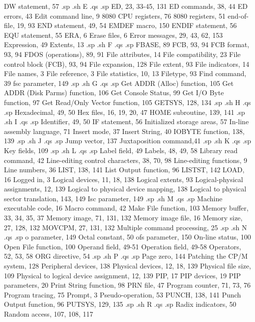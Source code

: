 DW statement, 57
.sp
.sh
E
.qs
.sp
ED, 23, 33-45, 131
ED commands, 38, 44
ED errors, 43
Edit command line, 9
8080 CPU registers, 76
8080 registers, 51
end-of-file, 19, 93
END statement, 49, 54
EMDEF macro, 150
ENDIF statement, 56
EQU statement, 55
ERA, 6
Erase files, 6
Error messages, 29, 43, 
    62, 153
Expression, 49
Extents, 13
.sp
.sh
F
.qs
.sp
FBASE, 89
FCB, 93, 94
FCB format, 93, 94
FDOS (operations), 89, 91
File attributes, 14
File compatibility, 23
File control block (FCB), 
    93, 94
File expansion, 128
File extent, 93
File indicators, 14
File names, 3
File reference, 3
File statistics, 10, 13
Filetype, 93
Find command, 39
fsc parameter, 149
.sp
.sh
G
.qs
.sp
Get ADDR (Alloc) function, 
    105
Get ADDR (Disk Parms) 
    function, 106
Get Console Status, 99
Get I/O Byte function, 97
Get Read/Only Vector 
    function, 105
GETSYS, 128, 134
.sp
.sh
H
.qs
.sp
Hexadecimal, 49, 50
Hex files, 16, 19, 20, 47
HOME subroutine, 139, 141
.sp
.sh
I
.qs
.sp
Identifier, 49, 50
IF statement, 56
Initialized storage areas, 57
In-line assembly language, 71
Insert mode, 37
Insert String, 40
IOBYTE function, 138, 139
.sp
.sh
J
.qs
.sp
Jump vector, 137
Juxtaposition command,41
.sp
.sh
K
.qs
.sp
Key fields, 109
.sp
.sh
L
.qs
.sp
Label field, 49
Labels, 48, 49, 58
Library read command, 42
Line-editing control 
    characters, 38, 70, 98
Line-editing functions, 9
Line numbers, 36
LIST, 138, 141
List Output function, 96
LISTST, 142
LOAD, 16
Logged in, 3
Logical devices, 11, 18, 138
Logical extents, 93
Logical-physical assignments, 
   12, 139
Logical to physical device 
    mapping, 138
Logical to physical sector 
    translation, 143, 149
Isc parameter, 149
.sp
.sh
M
.qs
.sp
Machine executable code, 16
Macro command, 42      
Make File function, 103
Memory buffer, 33, 34, 35, 37
Memory image, 71, 131, 132
Memory image file, 16
Memory size, 27, 128, 132
MOVCPM, 27, 131, 132
Multiple command 
    processing, 25
.sp
.sh
N
.qs
.sp
{o} parameter, 149
Octal constant, 50
ofs parameter, 150
On-line status, 100
Open File function, 100
Operand field, 49-51
Operation field, 49-58
Operators, 52, 53, 58
ORG directive, 54
.sp
.sh
P
.qs
.sp
Page zero, 144
Patching the CP/M system, 128
Peripheral devices, 138
Physical devices, 12, 18, 139
Physical file size, 109
Physical to logical device 
    assignment, 12, 139
PIP, 17
PIP devices, 19
PIP parameters, 20
Print String function, 98
PRN file, 47
Program counter, 71, 73, 76
Program tracing, 75
Prompt, 3
Pseudo-operation, 53
PUNCH, 138, 141
Punch Output function, 96
PUTSYS, 129, 135
.sp
.sh
R
.qs
.sp
Radix indicators, 50
Random access, 107, 108, 117
